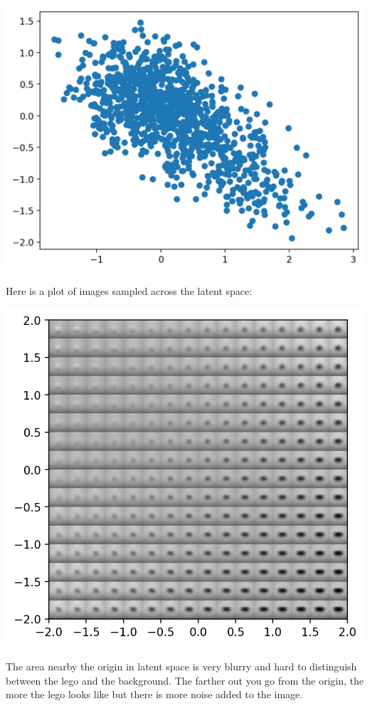 \documentclass[]{article}
\begin{document}
\begin{center}
  \includegraphics[scale=0.75]{latent_space-lego-dataset}
\end{center}

Here is a plot of images sampled across the latent space:

\begin{center}
  \includegraphics[scale=1]{latent_space_examples-lego-dataset}
\end{center}

The area nearby the origin in latent space is very blurry and hard
to distinguish between the lego and the background. The farther
out you go from the origin, the more the lego looks like but
there is more noise added to the image.
\end{document}
